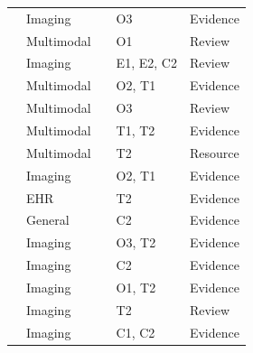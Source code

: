 {\begin{longtable}{@{}p{5.6cm}llll@{}}
\citet{oakdenrayner2020hidden} & Imaging &  & O3 & Evidence\\
\citet{schaefer2020use} & Multimodal &  & O1 & Review\\
\citet{willemink2020preparing} & Imaging &  & E1, E2, C2 & Review\\
\citet{wynants2020prediction} & Multimodal &  & O2, T1 & Evidence\\
\citet{chen2021ethical} & Multimodal &  & O3 & Review\\
\citet{finlayson2021clinician} & Multimodal &  & T1, T2 & Evidence\\
\citet{koh2021wilds} & Multimodal &  & T2 & Resource\\
\citet{roberts2021common} & Imaging &  & O2, T1 & Evidence\\
\citet{wong2021external} & EHR &  & T2 & Evidence\\
\citet{carlini2022membership} & General &  & C2 & Evidence\\
\citet{gichoya2022ai} & Imaging &  & O3, T2 & Evidence\\
\citet{packhauser2022deep} & Imaging &  & C2 & Evidence\\
\citet{varoquaux2022machine} & Imaging &  & O1, T2 & Evidence\\
\citet{yu2022external} & Imaging &  & T2 & Review\\
\citet{hatamizadeh2023do} & Imaging &  & C1, C2 & Evidence\\
\end{longtable}}

